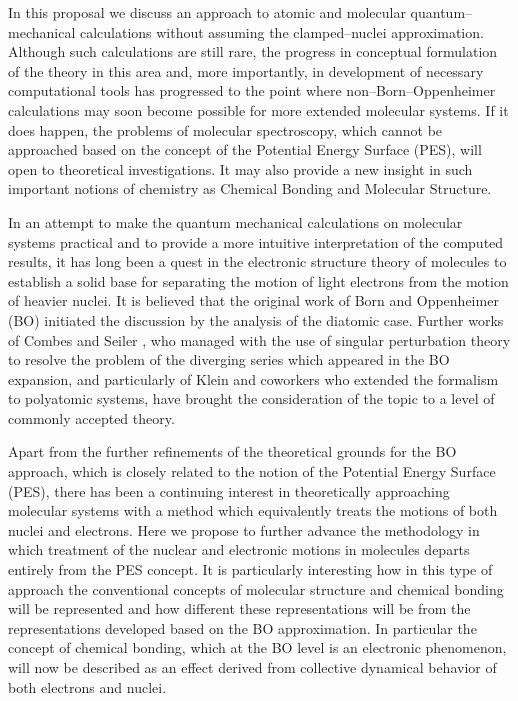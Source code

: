 In this proposal we discuss an approach to atomic and 
molecular quantum--mechanical calculations without assuming 
the clamped--nuclei approximation. Although such calculations
are still rare, the progress
in conceptual formulation of the theory in this area and, more
importantly, in development of necessary computational tools
has progressed to the point where non--Born--Oppenheimer
calculations may soon become possible for more extended molecular
systems. If it does happen, 
the problems of molecular spectroscopy,
which cannot be approached based 
on the concept of the Potential Energy Surface (PES),
will open to theoretical investigations.
It may also provide a new insight in such important notions of
chemistry as Chemical Bonding and Molecular Structure.

In an attempt to make the quantum mechanical calculations on 
molecular systems practical and to provide a more intuitive
interpretation of the computed results, it has long been a quest
in the electronic structure theory of molecules 
to establish a solid base for separating
the motion of light electrons from the motion of heavier nuclei.
It is believed that the original work of Born and Oppenheimer (BO)
\cite{BO1927} initiated the discussion by the analysis
of the diatomic case. Further works of Combes and Seiler
\cite{CS1980}, who managed with the use of singular perturbation
theory to resolve the problem of the diverging series which appeared
in the BO expansion, and particularly of Klein and coworkers
\cite{KM1992} who extended the formalism to polyatomic systems,
have brought the consideration of the topic to a level of commonly
accepted theory.

Apart from the further refinements of the theoretical grounds
for the BO approach, which is closely related to the notion
of the Potential Energy Surface (PES), there has been a continuing
interest in theoretically approaching molecular systems 
with a method which equivalently treats
the motions of both nuclei and electrons.
Here we propose to further advance the methodology 
in which treatment of the nuclear and electronic motions
in molecules departs entirely from the PES concept. 
It is particularly
interesting how in this type of approach the conventional concepts
of molecular structure and chemical bonding will be represented
and how different these representations will be 
from the representations
developed based on the BO approximation. In particular the concept
of chemical bonding, which at the BO level is an electronic 
phenomenon, will now be described as an effect derived from
collective dynamical behavior of both electrons and nuclei.

